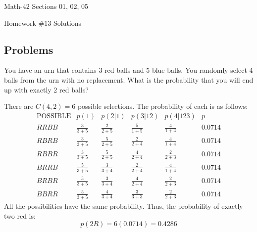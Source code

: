\documentclass[letterpaper,12pt,fleqn]{article}
\begin{document}
\begin{center}
  \large
  Math-42 Sections 01, 02, 05

  \Large
  Homework \#13 Solutions
\end{center}

\subsection*{Problems}

You have an urn that contains 3 red balls and 5 blue balls.  You randomly select 4 balls from the urn with no
replacement.  What is the probability that you will end up with exactly 2 red balls?

There are \(C(4,2)=6\) possible selections.  The probability of each is as follows:
\[\begin{array}{c|c|c|c|c|c}
\text{POSSIBLE} & p(1) & p(2|1) & p(3|12) & p(4|123) & p \\
\hline
RRBB & \frac{3}{3+5} & \frac{2}{2+5} & \frac{5}{1+5} & \frac{4}{1+4} & 0.0714 \\
RBRB & \frac{3}{3+5} & \frac{5}{2+5} & \frac{2}{2+4} & \frac{4}{1+4} & 0.0714 \\
RBBR & \frac{3}{3+5} & \frac{5}{2+5} & \frac{4}{2+4} & \frac{2}{2+3} & 0.0714 \\
BRRB & \frac{5}{3+5} & \frac{3}{3+4} & \frac{2}{2+4} & \frac{4}{1+4} & 0.0714 \\
BRBR & \frac{5}{3+5} & \frac{3}{3+4} & \frac{4}{2+4} & \frac{2}{2+3} & 0.0714 \\
BBRR & \frac{5}{3+5} & \frac{4}{3+4} & \frac{3}{3+3} & \frac{2}{2+3} & 0.0714
\end{array}\]
All the possibilities have the same probability.  Thus, the probability of exactly two red is:
\[p(2R)=6(0.0714)=0.4286\]
\end{document}
